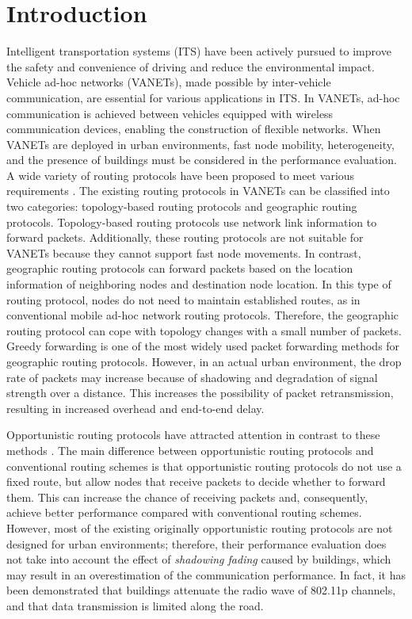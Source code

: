 \documentclass[conference]{IEEEtran}
\begin{document}
\section{Introduction}
Intelligent transportation systems (ITS) \cite{1} have been actively pursued to improve the safety and convenience of driving and  reduce the environmental impact. 
Vehicle ad-hoc networks (VANETs), made possible by inter-vehicle communication, are essential for various applications in ITS.
In VANETs,  ad-hoc communication is achieved between vehicles equipped with wireless communication devices, enabling the construction of flexible networks. 
When VANETs are deployed in  urban environments, fast node mobility, heterogeneity, and the presence of buildings must be considered in the performance evaluation. A wide variety of routing protocols have been proposed to meet various requirements \cite{2}.
The existing routing protocols in VANETs can be classified into two categories: topology-based routing protocols and geographic routing protocols. Topology-based routing protocols \cite{3,4,5} use network link information to forward packets. 
Additionally, these routing protocols are not suitable for VANETs because they cannot support fast node movements. In contrast, geographic routing protocols \cite{6,7,8,9,10,11,12,13,14,15} can forward packets based on the location information of neighboring nodes and destination node location. 
In this type of routing protocol, nodes do not need to maintain established routes, as in conventional mobile ad-hoc network routing protocols. 
Therefore, the geographic routing protocol can cope with topology changes with a small number of packets.
Greedy forwarding is one of the most widely used packet forwarding methods for geographic routing protocols.
However, in an actual urban environment, the drop rate of packets may increase because of shadowing and degradation of signal strength over a distance. This increases the possibility of packet retransmission, resulting in increased overhead and end-to-end delay. 

Opportunistic routing protocols have attracted attention in contrast to these methods \cite{16}. 
The main difference between opportunistic routing protocols and conventional routing schemes is that opportunistic routing protocols do not use a fixed route, but allow nodes that receive packets to decide whether to forward them. 
This can increase the chance of receiving packets and, consequently, achieve better performance compared with conventional routing schemes.
However, most of the existing originally opportunistic routing protocols  are not designed for urban environments; therefore, their performance evaluation does not take into account the effect of \textit{shadowing fading} caused by buildings, which may result in an overestimation of the communication performance. 
In fact, it has been demonstrated that buildings attenuate the radio wave of 802.11p channels, and that data transmission is limited along the road\cite{17}. 
\end{document}
